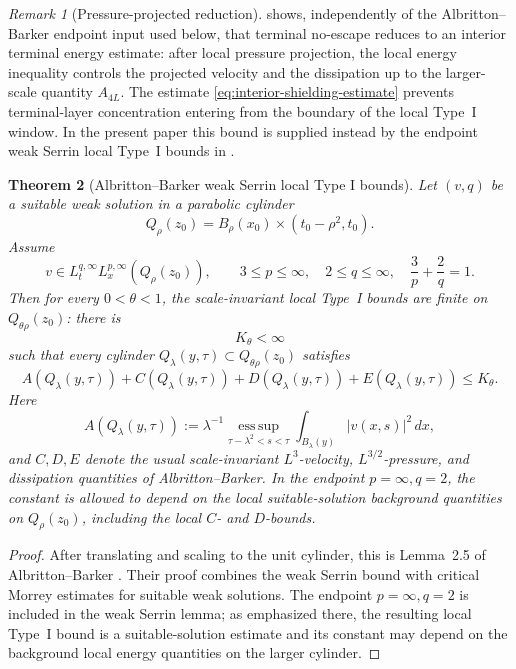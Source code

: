 \documentclass[11pt]{amsart}
\numberwithin{equation}{section}
\theoremstyle{plain}
\newtheorem{theorem}{Theorem}[section]
\theoremstyle{definition}
\theoremstyle{remark}
\newtheorem{remark}[theorem]{Remark}
\newcommand{\esssup}{\operatorname*{ess\,sup}}
\begin{document}
\begin{remark}[Pressure-projected reduction]
\label{rem:narrowed-final-bridge}
 shows, independently of the
Albritton--Barker endpoint input used below, that terminal no-escape reduces
to an interior terminal energy estimate: after local pressure projection, the local
energy inequality controls the projected velocity and the dissipation up to the
larger-scale quantity \(A_{4L}\).  The estimate
\eqref{eq:interior-shielding-estimate} prevents
terminal-layer concentration entering from the boundary of the local Type~I
window.  In the present paper this bound is supplied
instead by the endpoint weak Serrin local Type~I bounds in
.
\end{remark}

\begin{theorem}[Albritton--Barker weak Serrin local Type I bounds]
\label{thm:AB-weak-serrin-typeI-package}
Let \((v,q)\) be a suitable weak solution in a parabolic cylinder
\[
   Q_\rho(z_0)=B_\rho(x_0)\times(t_0-\rho^2,t_0).
\]
Assume
\[
   v\in L^{q,\infty}_tL^{p,\infty}_x(Q_\rho(z_0)),
   \qquad
   3\le p\le\infty,\quad 2\le q\le\infty,\quad
   \frac3p+\frac2q=1 .
\]
Then for every \(0<\theta<1\), the scale-invariant local Type~I bounds are
finite on \(Q_{\theta\rho}(z_0)\): there is
\[
   K_{\theta}<\infty
\]
such that every cylinder \(Q_\lambda(y,\tau)\subset Q_{\theta\rho}(z_0)\)
satisfies
\[
   A(Q_\lambda(y,\tau))+C(Q_\lambda(y,\tau))
   +D(Q_\lambda(y,\tau))+E(Q_\lambda(y,\tau))\le K_{\theta}.
\]
Here
\[
   A(Q_\lambda(y,\tau))
   :=
   \lambda^{-1}
   \esssup_{\tau-\lambda^2<s<\tau}
   \int_{B_\lambda(y)}|v(x,s)|^2\,dx ,
\]
and \(C,D,E\) denote the usual scale-invariant \(L^3\)-velocity,
\(L^{3/2}\)-pressure, and dissipation quantities of
Albritton--Barker.  In the endpoint \(p=\infty,q=2\), the constant is allowed
to depend on the local suitable-solution background quantities on
\(Q_\rho(z_0)\), including the local \(C\)- and \(D\)-bounds.
\end{theorem}

\begin{proof}
After translating and scaling to the unit cylinder, this is Lemma~2.5 of
Albritton--Barker \cite{AlbrittonBarker2019}.  Their proof combines the weak
Serrin bound with critical Morrey estimates for suitable weak solutions.  The
endpoint \(p=\infty,q=2\) is included in the weak Serrin lemma; as emphasized
there, the resulting local Type~I bound is a suitable-solution estimate and its
constant may depend on the background local energy quantities on the larger
cylinder.
\end{proof}
\end{document}
